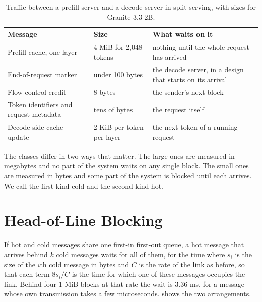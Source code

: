 \begin{table}[htbp]
  \centering
  \caption[Traffic between a prefill server and a decode server]{Traffic between a prefill server and a decode server in split serving, with sizes for Granite 3.3 2B.}
  \label{tab:traffic}
  \small
  \begin{tabular}{L{4.1cm}L{3.6cm}L{6.4cm}}
    \toprule
    Message & Size & What waits on it \\
    \midrule
    Prefill cache, one layer & 4 MiB for 2,048 tokens & nothing until the whole request has arrived \\
    End-of-request marker & under 100 bytes & the decode server, in a design that starts on its arrival \\
    Flow-control credit & 8 bytes & the sender's next block \\
    Token identifiers and request metadata & tens of bytes & the request itself \\
    Decode-side cache update & 2 KiB per token per layer & the next token of a running request \\
    \bottomrule
  \end{tabular}
\end{table}

The classes differ in two ways that matter. The large ones are measured in
megabytes and no part of the system waits on any single block. The small ones are
measured in bytes and some part of the system is blocked until each arrives. We call the first kind cold and the second kind hot.

\section{Head-of-Line Blocking}
\label{sec:hol}

If hot and cold messages share one first-in first-out queue, a hot message
that arrives behind $k$ cold messages waits for all of them, for the time
where $s_i$ is the size of the $i$th cold message in bytes and $C$ is the
rate of the link as before, so that each term $8 s_i / C$ is the time for
which one of these messages occupies the link.
Behind four 1 MiB blocks at that rate the wait is 3.36 ms, for a
message whose own transmission takes a few microseconds.  shows
the two arrangements.

